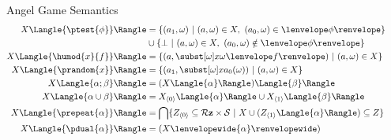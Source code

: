 \documentclass[slidestop,aspectratio=169]{beamer}
\newcommand{\allstate}{\mathcal{S}}
\newcommand{\tint}[2]{#2\lenvelope#1\renvelope}
\newcommand{\fint}[2]{#2\lenvelope#1\renvelope}
\newcommand{\om}{\omega}
\newcommand{\apL}[1]{#1_{\langle{0}\rangle}}
\newcommand{\apR}[1]{#1_{\langle{1}\rangle}}
\newcommand{\sff}{\bot}
\newcommand{\ssub}[3]{\subst[{#1}]{#2}{#3}}
\newcommand{\rzFst}[1]{#1_0}
\newcommand{\rzSnd}[1]{#1_1}
\renewcommand{\aa}{a}
\newcommand{\allRz}{\mathcal{R}\mathbf{z}}
\newcommand{\fintR}[1]{\fint{#1}{}} %
\newcommand*{\strategyforR}[2][]{{#2}\Langle{#1}\Rangle}
\newcommand*{\dstrategyforR}[2][]{{#2}\lenvelopewide{#1}\renvelopewide}
\theoremstyle{plain}
\theoremstyle{definition}
\theoremstyle{remark}
\begin{document}
\begin{frame}[t]{Angel Game Semantics}
\begin{align*}
\strategyforR[\ptest{\phi}]{X}            &= \{(\rzSnd{\aa},\om)~|~ (\aa,\om) \in X,~(\rzFst{\aa},\om) \in \fintR{\phi}\}\\
                                          &\cup \{\sff~|~(\aa,\om) \in X,~(\rzFst{\aa},\om) \notin \fintR{\phi}\}\\
\strategyforR[\humod{x}{f}]{X}  &= \{(\aa,\ssub{\om}{x}{\tint{f}{\om}})~|~(\aa,\om) \in X\}&&\text{}\\
\strategyforR[\prandom{x}]{X}          &= \{(\rzSnd{\aa},\ssub{\om}{x}{\rzFst{\aa}(\om)})~|~(\aa,\om) \in X\}&&\text{}\\
\strategyforR[\alpha;\beta]{X}           &= \strategyforR[\beta]{(\strategyforR[\alpha]{X})} &&\text{}\\
\strategyforR[\alpha\cup\beta]{X}      &= \strategyforR[\alpha]{\apL{X}} \cup \strategyforR[\beta]{\apR{X}}&&\text{}\\
\strategyforR[\prepeat{\alpha}]{X}     &= \bigcap\{\apL{Z}\subseteq \allRz \times \allstate~|~ X \cup (\strategyforR[\alpha]{\apR{Z}}) \subseteq Z\}
&&\\
\strategyforR[\pdual{\alpha}]{X}        &= (\dstrategyforR[\alpha]{X})&&\text{}
\end{align*}
\end{frame}
\end{document}
